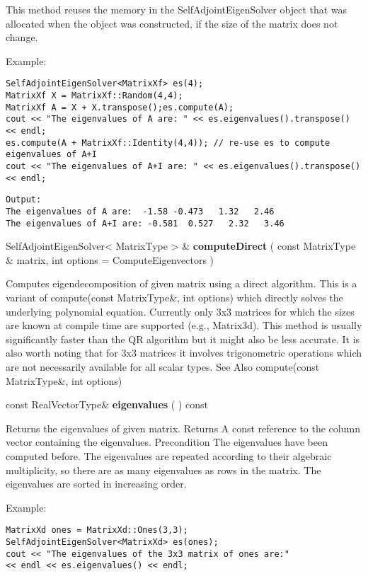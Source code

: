 This method reuses the memory in the SelfAdjointEigenSolver object that was allocated when the object was constructed, if the size of the matrix does not change.


Example:
\begin{lstlisting}
SelfAdjointEigenSolver<MatrixXf> es(4);
MatrixXf X = MatrixXf::Random(4,4);
MatrixXf A = X + X.transpose();es.compute(A);
cout << "The eigenvalues of A are: " << es.eigenvalues().transpose() << endl;
es.compute(A + MatrixXf::Identity(4,4)); // re-use es to compute eigenvalues of A+I
cout << "The eigenvalues of A+I are: " << es.eigenvalues().transpose() << endl;
\end{lstlisting}

\begin{verbatim}
Output:
The eigenvalues of A are:  -1.58 -0.473   1.32   2.46
The eigenvalues of A+I are: -0.581  0.527   2.32   3.46
\end{verbatim}



\vspace{0.3cm}
SelfAdjointEigenSolver< MatrixType > \& \textbf{computeDirect}  ( const MatrixType \&  matrix,   int  options = ComputeEigenvectors  )   

Computes eigendecomposition of given matrix using a direct algorithm. 
This is a variant of compute(const MatrixType\&, int options) which directly solves the underlying polynomial equation.
Currently only 3x3 matrices for which the sizes are known at compile time are supported (e.g., Matrix3d).
This method is usually significantly faster than the QR algorithm but it might also be less accurate. It is also worth noting that for 3x3 matrices it involves trigonometric operations which are not necessarily available for all scalar types.
See Also
compute(const MatrixType\&, int options) 


\vspace{0.3cm}
const RealVectorType\& \textbf{eigenvalues}  ( )  const 

Returns the eigenvalues of given matrix. 
Returns A const reference to the column vector containing the eigenvalues.
Precondition
The eigenvalues have been computed before.
The eigenvalues are repeated according to their algebraic multiplicity, so there are as many eigenvalues as rows in the matrix. The eigenvalues are sorted in increasing order.


Example:
\begin{lstlisting}
MatrixXd ones = MatrixXd::Ones(3,3);
SelfAdjointEigenSolver<MatrixXd> es(ones);
cout << "The eigenvalues of the 3x3 matrix of ones are:" 
<< endl << es.eigenvalues() << endl;
\end{lstlisting}

